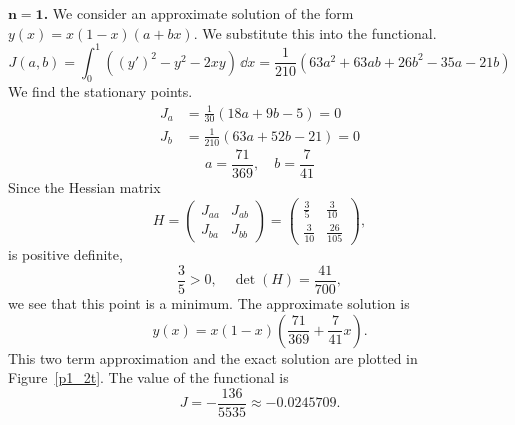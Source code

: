 \begin{Solution}
\begin{enumerate}
    \textbf{$\mathbf{n \boldsymbol{=} 1}$.}
    We consider an approximate solution of the form $y(x) = x (1-x)( a + b x )$.  
    We substitute this into the functional.
    \[
    J(a,b) = \int_0^1 \left( (y')^2 - y^2 - 2 x y \right) \,\dd x  
    = \frac{1}{210} \left( 63 a^2 + 63 a b + 26 b^2 - 35 a - 21 b \right)
    \]
    We find the stationary points.
    \begin{align*}
      J_a &= \frac{1}{30} (18 a + 9 b - 5) = 0 \\
      J_b &= \frac{1}{210} (63 a + 52 b - 21) = 0
    \end{align*}
    \[
    a = \frac{71}{369}, \quad b = \frac{7}{41}
    \]
    Since the Hessian matrix
    \[
    H = 
    \begin{pmatrix}
      J_{a a} & J_{a b} \\
      J_{b a} & J_{b b}
    \end{pmatrix}
    =
    \begin{pmatrix}
      \frac{3}{5} & \frac{3}{10} \\
      \frac{3}{10} & \frac{26}{105}
    \end{pmatrix},
    \]
    is positive definite,
    \[
    \frac{3}{5} > 0, \quad \det(H) = \frac{41}{700},
    \]
    we see that this point is a minimum.  The approximate solution is
    \[
    \boxed{
      y(x) = x (1-x) \left( \frac{71}{369} + \frac{7}{41} x \right).
      }
    \]
    This two term approximation and the exact solution are plotted in 
    Figure~\ref{p1_2t}.  The value of the functional is
    \[
    \boxed{
      J = - \frac{136}{5535} \approx -0.0245709.
      }
    \]



\end{enumerate}
\end{Solution}
